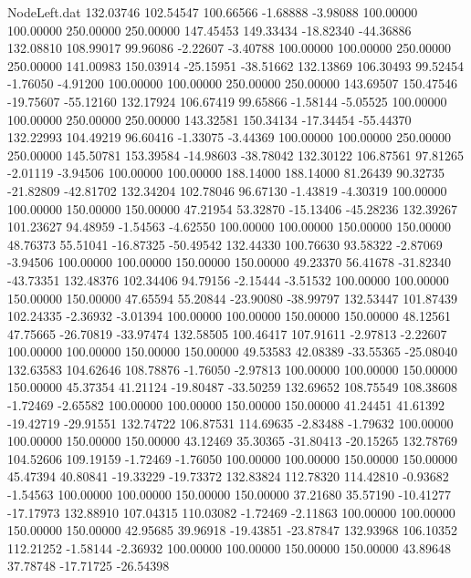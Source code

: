 \begin{filecontents}{NodeLeft.dat}
 132.03746  102.54547  100.66566    -1.68888   -3.98088  100.00000  100.00000  250.00000  250.00000  147.45453  149.33434  -18.82340  -44.36886
 132.08810  108.99017   99.96086    -2.22607   -3.40788  100.00000  100.00000  250.00000  250.00000  141.00983  150.03914  -25.15951  -38.51662
 132.13869  106.30493   99.52454    -1.76050   -4.91200  100.00000  100.00000  250.00000  250.00000  143.69507  150.47546  -19.75607  -55.12160
 132.17924  106.67419   99.65866    -1.58144   -5.05525  100.00000  100.00000  250.00000  250.00000  143.32581  150.34134  -17.34454  -55.44370
 132.22993  104.49219   96.60416    -1.33075   -3.44369  100.00000  100.00000  250.00000  250.00000  145.50781  153.39584  -14.98603  -38.78042
 132.30122  106.87561   97.81265    -2.01119   -3.94506  100.00000  100.00000  188.14000  188.14000   81.26439   90.32735  -21.82809  -42.81702
 132.34204  102.78046   96.67130    -1.43819   -4.30319  100.00000  100.00000  150.00000  150.00000   47.21954   53.32870  -15.13406  -45.28236
 132.39267  101.23627   94.48959    -1.54563   -4.62550  100.00000  100.00000  150.00000  150.00000   48.76373   55.51041  -16.87325  -50.49542
 132.44330  100.76630   93.58322    -2.87069   -3.94506  100.00000  100.00000  150.00000  150.00000   49.23370   56.41678  -31.82340  -43.73351
 132.48376  102.34406   94.79156    -2.15444   -3.51532  100.00000  100.00000  150.00000  150.00000   47.65594   55.20844  -23.90080  -38.99797
 132.53447  101.87439  102.24335    -2.36932   -3.01394  100.00000  100.00000  150.00000  150.00000   48.12561   47.75665  -26.70819  -33.97474
 132.58505  100.46417  107.91611    -2.97813   -2.22607  100.00000  100.00000  150.00000  150.00000   49.53583   42.08389  -33.55365  -25.08040
 132.63583  104.62646  108.78876    -1.76050   -2.97813  100.00000  100.00000  150.00000  150.00000   45.37354   41.21124  -19.80487  -33.50259
 132.69652  108.75549  108.38608    -1.72469   -2.65582  100.00000  100.00000  150.00000  150.00000   41.24451   41.61392  -19.42719  -29.91551
 132.74722  106.87531  114.69635    -2.83488   -1.79632  100.00000  100.00000  150.00000  150.00000   43.12469   35.30365  -31.80413  -20.15265
 132.78769  104.52606  109.19159    -1.72469   -1.76050  100.00000  100.00000  150.00000  150.00000   45.47394   40.80841  -19.33229  -19.73372
 132.83824  112.78320  114.42810    -0.93682   -1.54563  100.00000  100.00000  150.00000  150.00000   37.21680   35.57190  -10.41277  -17.17973
 132.88910  107.04315  110.03082    -1.72469   -2.11863  100.00000  100.00000  150.00000  150.00000   42.95685   39.96918  -19.43851  -23.87847
 132.93968  106.10352  112.21252    -1.58144   -2.36932  100.00000  100.00000  150.00000  150.00000   43.89648   37.78748  -17.71725  -26.54398

\end{filecontents}
